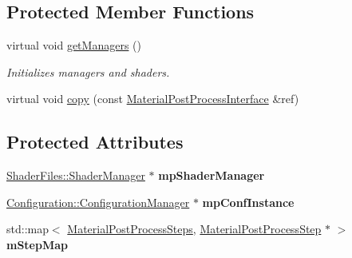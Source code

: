 \subsection*{Protected Member Functions}
\begin{DoxyCompactItemize}
\item 
\mbox{\label{class_geometry_engine_1_1_custom_shading_1_1_material_post_process_interface_a8987634f73ace6670cf77390ca6ae71f}} 
virtual void \mbox{\hyperlink{class_geometry_engine_1_1_custom_shading_1_1_material_post_process_interface_a8987634f73ace6670cf77390ca6ae71f}{get\+Managers}} ()
\begin{DoxyCompactList}\small\item\em Initializes managers and shaders. \end{DoxyCompactList}\item 
virtual void \mbox{\hyperlink{class_geometry_engine_1_1_custom_shading_1_1_material_post_process_interface_a64c1c173ff46d30bd3beddc4081b3c57}{copy}} (const \mbox{\hyperlink{class_geometry_engine_1_1_custom_shading_1_1_material_post_process_interface}{Material\+Post\+Process\+Interface}} \&ref)
\end{DoxyCompactItemize}
\subsection*{Protected Attributes}
\begin{DoxyCompactItemize}
\item 
\mbox{\label{class_geometry_engine_1_1_custom_shading_1_1_material_post_process_interface_a2e00306c95044891875c7570c26c4f15}} 
\mbox{\hyperlink{class_shader_files_1_1_shader_manager}{Shader\+Files\+::\+Shader\+Manager}} $\ast$ {\bfseries mp\+Shader\+Manager}
\item 
\mbox{\label{class_geometry_engine_1_1_custom_shading_1_1_material_post_process_interface_a28a1b787bd3c5d06c6057232ba24805f}} 
\mbox{\hyperlink{class_configuration_1_1_configuration_manager}{Configuration\+::\+Configuration\+Manager}} $\ast$ {\bfseries mp\+Conf\+Instance}
\item 
\mbox{\label{class_geometry_engine_1_1_custom_shading_1_1_material_post_process_interface_ac7c0fdb3268b697795f20a4e0307b09c}} 
std\+::map$<$ \mbox{\hyperlink{namespace_geometry_engine_1_1_custom_shading_af8b09b91ca7086f4f67a5d4181f35e58}{Material\+Post\+Process\+Steps}}, \mbox{\hyperlink{class_geometry_engine_1_1_custom_shading_1_1_material_post_process_step}{Material\+Post\+Process\+Step}} $\ast$ $>$ {\bfseries m\+Step\+Map}
\end{DoxyCompactItemize}


